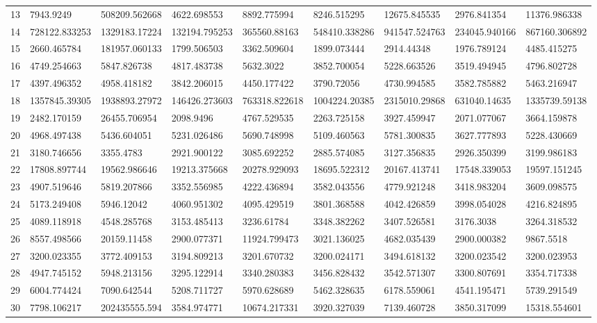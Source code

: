\begin{table*}[hb!]
\begin{tabular}{|p{0.8cm}|p{1.6cm}|p{1.6cm}|p{1.6cm}|p{1.6cm}|p{1.6cm}|p{1.6cm}|p{1.6cm}|p{1.6cm}|}
13  & 7943.9249 & 508209.562668 & 4622.698553 & 8892.775994 & 8246.515295 & 12675.845535 & 2976.841354 & 11376.986338 \\ 
14  & 728122.833253 & 1329183.17224 & 132194.795253 & 365560.88163 & 548410.338286 & 941547.524763 & 234045.940166 & 867160.306892 \\ 
15  & 2660.465784 & 181957.060133 & 1799.506503 & 3362.509604 & 1899.073444 & 2914.44348 & 1976.789124 & 4485.415275 \\ 
16  & 4749.254663 & 5847.826738 & 4817.483738 & 5632.3022 & 3852.700054 & 5228.663526 & 3519.494945 & 4796.802728 \\ 
17  & 4397.496352 & 4958.418182 & 3842.206015 & 4450.177422 & 3790.72056 & 4730.994585 & 3582.785882 & 5463.216947 \\ 
18  & 1357845.39305 & 1938893.27972 & 146426.273603 & 763318.822618 & 1004224.20385 & 2315010.29868 & 631040.14635 & 1335739.59138 \\ 
19  & 2482.170159 & 26455.706954 & 2098.9496 & 4767.529535 & 2263.725158 & 3927.459947 & 2071.077067 & 3664.159878 \\ 
20  & 4968.497438 & 5436.604051 & 5231.026486 & 5690.748998 & 5109.460563 & 5781.300835 & 3627.777893 & 5228.430669 \\ 
21  & 3180.746656 & 3355.4783 & 2921.900122 & 3085.692252 & 2885.574085 & 3127.356835 & 2926.350399 & 3199.986183 \\ 
22  & 17808.897744 & 19562.986646 & 19213.375668 & 20278.929093 & 18695.522312 & 20167.413741 & 17548.339053 & 19597.151245 \\ 
23  & 4907.519646 & 5819.207866 & 3352.556985 & 4222.436894 & 3582.043556 & 4779.921248 & 3418.983204 & 3609.098575 \\ 
24  & 5173.249408 & 5946.12042 & 4060.951302 & 4095.429519 & 3801.368588 & 4042.426859 & 3998.054028 & 4216.824895 \\ 
25  & 4089.118918 & 4548.285768 & 3153.485413 & 3236.61784 & 3348.382262 & 3407.526581 & 3176.3038 & 3264.318532 \\ 
26  & 8557.498566 & 20159.11458 & 2900.077371 & 11924.799473 & 3021.136025 & 4682.035439 & 2900.000382 & 9867.5518 \\ 
27  & 3200.023355 & 3772.409153 & 3194.809213 & 3201.670732 & 3200.024171 & 3494.618132 & 3200.023542 & 3200.023953 \\ 
28  & 4947.745152 & 5948.213156 & 3295.122914 & 3340.280383 & 3456.828432 & 3542.571307 & 3300.807691 & 3354.717338 \\ 
29  & 6004.774424 & 7090.642544 & 5208.711727 & 5970.628689 & 5462.328635 & 6178.559061 & 4541.195471 & 5739.291549 \\ 
30  & 7798.106217 & 202435555.594 & 3584.974771 & 10674.217331 & 3920.327039 & 7139.460728 & 3850.317099 & 15318.554601 \\ 
\hline


 \end{tabular}
\end{table*}
